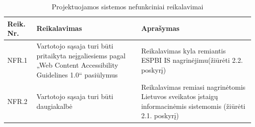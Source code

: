 \begin{table}[!ht]
    \centering
    \renewcommand{\arraystretch}{1.2}
    \renewcommand\thetable{6}
    \caption{Projektuojamos sistemos nefunkciniai reikalavimai} 

    \begin{tabular}{|m{3em}|m{17em}|m{17em}|}
    \hline 
    \rowcolor[HTML]{EFEFEF} 
    Reik. Nr. & Reikalavimas & Aprašymas \\ \hline

    NFR.1  &  Vartotojo sąsaja turi būti pritaikyta neįgaliesiems pagal „Web Content Accessibility Guidelines 1.0“ pasiūlymus  &  Reikalavimas kyla remiantis ESPBI IS nagrinėjimu(žiūrėti 2.2. poskyrį)       \\ \hline
    NFR.2  &  Vartotojo sąsaja turi būti daugiakalbė &  Reikalavimas remiasi nagrinėtomis Lietuvos sveikatos įstaigų informacinėmis sistemomis (žiūrėti 2.1. poskyrį)       \\ \hline


    \end{tabular}

\end{table}

